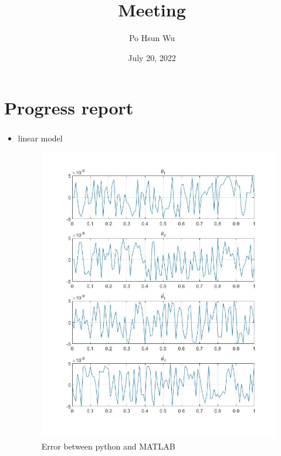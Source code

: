 \documentclass{beamer}
\date{July 20, 2022}
\title{Meeting}
\author{Po Hsun Wu}
\begin{document}
    \maketitle

    \section*{Progress report}
    \begin{frame}
        \frametitle{\secname}

        \begin{itemize}
            \item linear model
            \begin{figure}
                \centering
                \begin{multicols}{2}
                    \includegraphics[scale=.18]{Figs/linear_error_python.jpg}
                    \caption{Error between python and MATLAB}
                    \columnbreak


\end{multicols}
\end{figure}
\end{itemize}
\end{frame}
\end{document}
